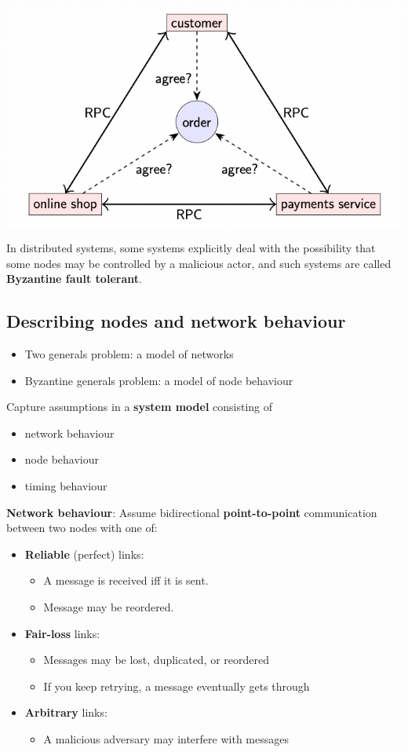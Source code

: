 \documentclass[11pt]{article}
\begin{document}
\begin{center}
\includegraphics[width=.6\textwidth]{../images/DistributiveSystems/4.png}
\label{}
\end{center}

In distributed systems, some systems explicitly deal with the possibility that some nodes may be
controlled by a malicious actor, and such systems are called \textbf{Byzantine fault tolerant}.
\subsection{Describing nodes and network behaviour}
\label{sec:orge1df0cc}
\begin{itemize}
\item Two generals problem: a model of networks
\item Byzantine generals problem: a model of node behaviour
\end{itemize}

Capture assumptions in a \textbf{system model} consisting of
\begin{itemize}
\item network behaviour
\item node behaviour
\item timing behaviour
\end{itemize}

\textbf{Network behaviour}: Assume bidirectional \textbf{point-to-point} communication between two nodes with one
of:
\begin{itemize}
\item \textbf{Reliable} (perfect) links:
\begin{itemize}
\item A message is received iff it is sent.
\item Message may be reordered.
\end{itemize}
\item \textbf{Fair-loss} links:
\begin{itemize}
\item Messages may be lost, duplicated, or reordered
\item If you keep retrying, a message eventually gets through
\end{itemize}
\item \textbf{Arbitrary} links:
\begin{itemize}
\item A malicious adversary may interfere with messages
\end{itemize}
\end{itemize}

\begin{center}\end{center}
\end{document}
